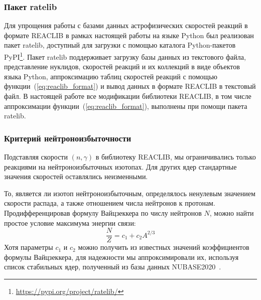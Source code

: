 \subsubsection{Пакет ratelib}
Для упрощения работы с базами данных астрофизических скоростей реакций в формате REACLIB в рамках настоящей работы на языке Python был реализован пакет ratelib, доступный для загрузки с помощью каталога Python-пакетов PyPI\footnote{\href{https://pypi.org/project/ratelib/}{https://pypi.org/project/ratelib/}}. Пакет ratelib поддерживает загрузку базы данных из текстового файла, представление нуклидов, скоростей реакций и их коллекций в виде объектов языка Python, аппроксимацию таблиц скоростей реакций с помощью функции~(\ref{eq:reaclib_format}) и вывод данных в формате REACLIB в текстовый файл. В настоящей работе все модификации библиотеки REACLIB, в том числе аппроксимации функции~(\ref{eq:reaclib_format}), выполнены при помощи пакета ratelib.

\subsubsection{Критерий нейтроноизбыточности} \label{sec:nrich_criteria}
Подставляя скорости $(n,\gamma)$ в библиотеку REACLIB, мы ограничивались только реакциями на нейтроноизбыточных изотопах. Для других ядер стандартные значения скоростей оставлялись неизменными.

То, является ли изотоп нейтроноизбыточным, определялось ненулевым значением скорости распада, а также отношением числа нейтронов к протонам. Продифференцировав формулу Вайцзеккера по числу нейтронов $N$, можно найти простое условие максимума энергии связи:
\begin{equation}
  \displaystyle
  \frac{N}{Z} = c_1 + c_2 A^{2/3}
  \label{eq:nzratio}
\end{equation}
Хотя параметры $c_1$ и $c_2$ можно получить из известных значений коэффициентов формулы Вайцзеккера, для надежности мы аппроксимировали их, используя список стабильных ядер, полученный из базы данных NUBASE2020~\cite{kondev2021}.
